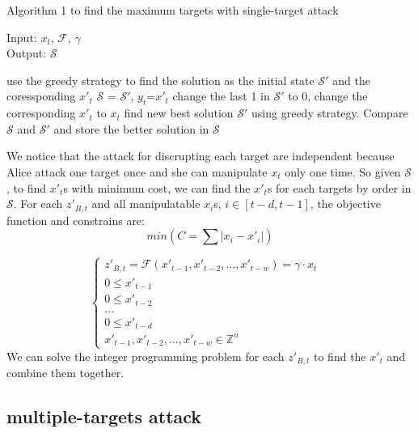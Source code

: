 \documentclass[journal]{IEEEtran}
\begin{document}
{\begin{algorithm}
\caption{Algorithm 1 to find the maximum targets with single-target attack}
Input:
$x_t$, $\mathcal{F}$, $\gamma$ \\
Output: $\mathcal{S}$
\begin{algorithmic}[1]
\STATE use the greedy strategy to find the solution as the initial state $\mathcal{S}'$ and the coressponding $x'_t$
\STATE $\mathcal{S}$ = $\mathcal{S}'$, $y_t$=$x'_t$
\REPEAT
	\STATE change the last 1 in $\mathcal{S}'$ to 0, 
	\STATE change the corresponding $x'_t$ to $x_t$
    \STATE find new best solution $\mathcal{S}'$ using greedy strategy.
    \STATE Compare $\mathcal{S}$ and $\mathcal{S}'$ and store the better solution in $\mathcal{S}$
\end{algorithmic}
\end{algorithm}

We notice that the attack for discrupting each target are independent because Alice attack one target once and she can manipulate $x_t$ only one time. So given $\mathcal{S}$, to find $x'_t$s with minimum cost, we can find the $x'_t$s for each targets by order in $\mathcal{S}$. For each $z'_{B,t}$ and all manipulatable $x_i$s, $i\in[t-d,t-1]$, the objective function and constrains are:
\begin{equation}
min(C=\sum|x_i-x'_i|)
\end{equation}

\begin{equation}
\left\{
             \begin{array}{lr}
             z'_{B,t}=\mathcal{F}(x'_{t-1}, x'_{t-2}, \dots, x'_{t-w})=\gamma \cdot x_t &  \\
             0 \leq x'_{t-1}\\
             0 \leq x'_{t-2}\\
             \dots          \\
             0 \leq x'_{t-d}\\
             x'_{t-1}, x'_{t-2}, \dots, x'_{t-w}\in\mathbb{Z}^{n}
             \end{array}
\right.
\end{equation}
We can solve the integer programming problem for each $z'_{B,t}$ to find the $x'_t$ and combine them together.

\subsection{multiple-targets attack}

}
\end{document}

